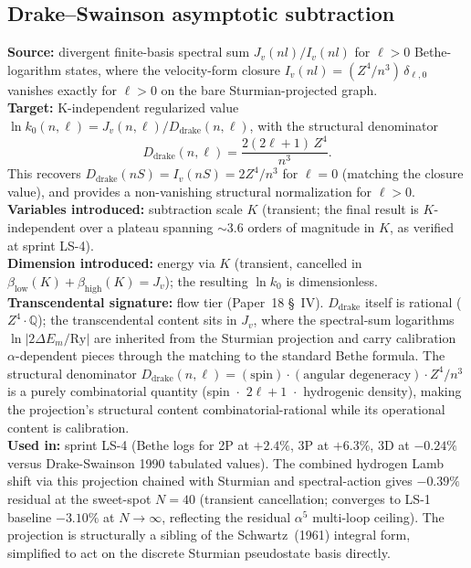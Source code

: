 \documentclass[11pt]{article}
\begin{document}
\subsection{Drake--Swainson asymptotic subtraction}
\label{sec:proj_drake_swainson}
\textbf{Source:} divergent finite-basis spectral sum
$J_v(nl) / I_v(nl)$ for $\ell > 0$ Bethe-logarithm states, where the
velocity-form closure $I_v(nl) = (Z^4/n^3)\,\delta_{\ell,0}$ vanishes
exactly for $\ell > 0$ on the bare Sturmian-projected graph.\\
\textbf{Target:} K-independent regularized value
$\ln k_0(n,\ell) = J_v(n,\ell) / D_{\text{drake}}(n,\ell)$, with the
structural denominator
\[
  D_{\text{drake}}(n,\ell) = \frac{2(2\ell + 1)\,Z^4}{n^3}.
\]
This recovers $D_{\text{drake}}(nS) = I_v(nS) = 2Z^4/n^3$ for $\ell = 0$
(matching the closure value), and provides a non-vanishing structural
normalization for $\ell > 0$.\\
\textbf{Variables introduced:} subtraction scale $K$ (transient; the
final result is $K$-independent over a plateau spanning $\sim 3.6$
orders of magnitude in $K$, as verified at sprint LS-4).\\
\textbf{Dimension introduced:} energy via $K$ (transient,
cancelled in $\beta_{\text{low}}(K) + \beta_{\text{high}}(K) = J_v$);
the resulting $\ln k_0$ is dimensionless.\\
\textbf{Transcendental signature:} flow tier (Paper~18 \S~IV).
$D_{\text{drake}}$ itself is rational ($Z^4 \cdot \mathbb{Q}$); the
transcendental content sits in $J_v$, where the spectral-sum
logarithms $\ln |2 \Delta E_m / \mathrm{Ry}|$ are inherited from the
Sturmian projection and carry calibration $\alpha$-dependent pieces
through the matching to the standard Bethe formula.  The structural
denominator
$D_{\text{drake}}(n,\ell) = (\text{spin})\cdot(\text{angular degeneracy})\cdot Z^4/n^3$
is a purely combinatorial quantity (spin~$\cdot$~$2\ell+1$~$\cdot$~hydrogenic
density), making the projection's structural content
combinatorial-rational while its operational content is calibration.\\
\textbf{Used in:} sprint LS-4 (Bethe logs for 2P at $+2.4\%$, 3P at
$+6.3\%$, 3D at $-0.24\%$ versus Drake-Swainson 1990 tabulated
values).  The combined hydrogen Lamb shift via this projection
chained with Sturmian and spectral-action gives $-0.39\%$ residual at
the sweet-spot $N=40$ (transient cancellation; converges to LS-1
baseline $-3.10\%$ at $N \to \infty$, reflecting the residual
$\alpha^5$ multi-loop ceiling).  The projection is structurally a
sibling of the Schwartz~(1961) integral form, simplified to act on
the discrete Sturmian pseudostate basis directly.
\end{document}

